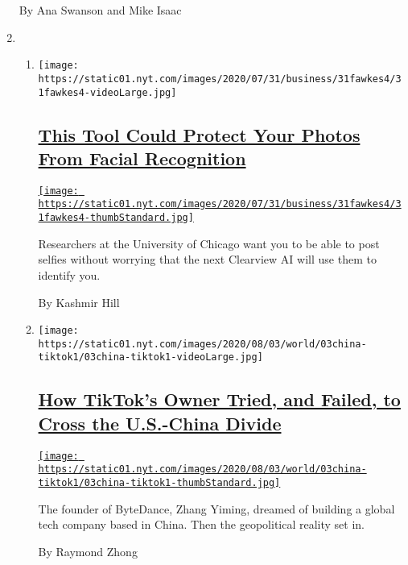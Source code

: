 \begin{enumerate}
  By Ana Swanson and Mike Isaac
\item
  \begin{enumerate}
  \def\labelenumii{\arabic{enumii}.}
  \item
    \texttt{[image: https://static01.nyt.com/images/2020/07/31/business/31fawkes4/31fawkes4-videoLarge.jpg]}

    \hypertarget{this-tool-could-protect-your-photos-from-facial-recognition}{%
    \subsection{\texorpdfstring{\href{/2020/08/03/technology/fawkes-tool-protects-photos-from-facial-recognition.html}{This
    Tool Could Protect Your Photos From Facial
    Recognition}}{This Tool Could Protect Your Photos From Facial Recognition}}\label{this-tool-could-protect-your-photos-from-facial-recognition}}

    \href{/2020/08/03/technology/fawkes-tool-protects-photos-from-facial-recognition.html}{\texttt{[image: https://static01.nyt.com/images/2020/07/31/business/31fawkes4/31fawkes4-thumbStandard.jpg]}}

    Researchers at the University of Chicago want you to be able to post
    selfies without worrying that the next Clearview AI will use them to
    identify you.

    By Kashmir Hill
  \item
    \texttt{[image: https://static01.nyt.com/images/2020/08/03/world/03china-tiktok1/03china-tiktok1-videoLarge.jpg]}

    \hypertarget{how-tiktoks-owner-tried-and-failed-to-cross-the-us-china-divide}{%
    \subsection{\texorpdfstring{\href{/2020/08/03/technology/tiktok-bytedance-us-china.html}{How
    TikTok's Owner Tried, and Failed, to Cross the U.S.-China
    Divide}}{How TikTok's Owner Tried, and Failed, to Cross the U.S.-China Divide}}\label{how-tiktoks-owner-tried-and-failed-to-cross-the-us-china-divide}}

    \href{/2020/08/03/technology/tiktok-bytedance-us-china.html}{\texttt{[image: https://static01.nyt.com/images/2020/08/03/world/03china-tiktok1/03china-tiktok1-thumbStandard.jpg]}}

    The founder of ByteDance, Zhang Yiming, dreamed of building a global
    tech company based in China. Then the geopolitical reality set in.

    By Raymond Zhong
  \end{enumerate}
\end{enumerate}

